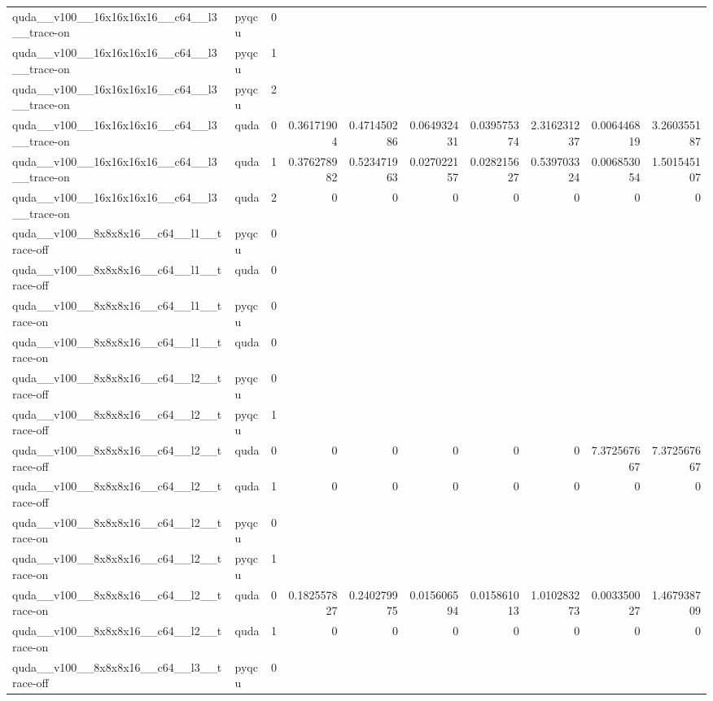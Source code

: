 \begin{table}[htbp]
\begin{tabular}{@{}llrrrrrrrr@{}}
quda\_\_v100\_\_16x16x16x16\_\_c64\_\_l3\_\_trace-on & pyqcu & 0 &  &  &  &  &  &  &  \\
quda\_\_v100\_\_16x16x16x16\_\_c64\_\_l3\_\_trace-on & pyqcu & 1 &  &  &  &  &  &  &  \\
quda\_\_v100\_\_16x16x16x16\_\_c64\_\_l3\_\_trace-on & pyqcu & 2 &  &  &  &  &  &  &  \\
quda\_\_v100\_\_16x16x16x16\_\_c64\_\_l3\_\_trace-on & quda & 0 & 0.36171904 & 0.471450286 & 0.064932431 & 0.039575374 & 2.316231237 & 0.006446819 & 3.260355187 \\
quda\_\_v100\_\_16x16x16x16\_\_c64\_\_l3\_\_trace-on & quda & 1 & 0.376278982 & 0.523471963 & 0.027022157 & 0.028215627 & 0.539703324 & 0.006853054 & 1.501545107 \\
quda\_\_v100\_\_16x16x16x16\_\_c64\_\_l3\_\_trace-on & quda & 2 & 0 & 0 & 0 & 0 & 0 & 0 & 0 \\
quda\_\_v100\_\_8x8x8x16\_\_c64\_\_l1\_\_trace-off & pyqcu & 0 &  &  &  &  &  &  &  \\
quda\_\_v100\_\_8x8x8x16\_\_c64\_\_l1\_\_trace-off & quda & 0 &  &  &  &  &  &  &  \\
quda\_\_v100\_\_8x8x8x16\_\_c64\_\_l1\_\_trace-on & pyqcu & 0 &  &  &  &  &  &  &  \\
quda\_\_v100\_\_8x8x8x16\_\_c64\_\_l1\_\_trace-on & quda & 0 &  &  &  &  &  &  &  \\
quda\_\_v100\_\_8x8x8x16\_\_c64\_\_l2\_\_trace-off & pyqcu & 0 &  &  &  &  &  &  &  \\
quda\_\_v100\_\_8x8x8x16\_\_c64\_\_l2\_\_trace-off & pyqcu & 1 &  &  &  &  &  &  &  \\
quda\_\_v100\_\_8x8x8x16\_\_c64\_\_l2\_\_trace-off & quda & 0 & 0 & 0 & 0 & 0 & 0 & 7.372567667 & 7.372567667 \\
quda\_\_v100\_\_8x8x8x16\_\_c64\_\_l2\_\_trace-off & quda & 1 & 0 & 0 & 0 & 0 & 0 & 0 & 0 \\
quda\_\_v100\_\_8x8x8x16\_\_c64\_\_l2\_\_trace-on & pyqcu & 0 &  &  &  &  &  &  &  \\
quda\_\_v100\_\_8x8x8x16\_\_c64\_\_l2\_\_trace-on & pyqcu & 1 &  &  &  &  &  &  &  \\
quda\_\_v100\_\_8x8x8x16\_\_c64\_\_l2\_\_trace-on & quda & 0 & 0.182557827 & 0.240279975 & 0.015606594 & 0.015861013 & 1.010283273 & 0.003350027 & 1.467938709 \\
quda\_\_v100\_\_8x8x8x16\_\_c64\_\_l2\_\_trace-on & quda & 1 & 0 & 0 & 0 & 0 & 0 & 0 & 0 \\
quda\_\_v100\_\_8x8x8x16\_\_c64\_\_l3\_\_trace-off & pyqcu & 0 &  &  &  &  &  &  &  \\

\end{tabular}
\end{table}
